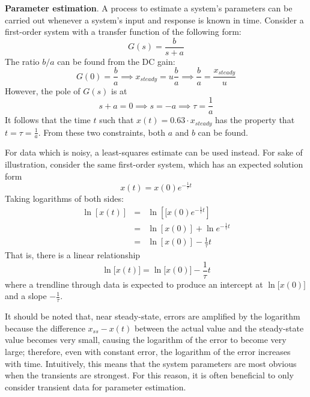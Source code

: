 \begin{shaded}
\textbf{Parameter estimation}. A process to estimate a system's parameters can be carried out whenever a system's input and response is known in time. Consider a first-order system with a transfer function of the following form: \[G(s) = \frac{b}{s+a}\] The ratio $b/a$ can be found from the DC gain: \[G(0) = \frac{b}{a} \implies x_{steady} = u \frac{b}{a} \implies \frac{b}{a} = \frac{x_{steady}}{u}\] However, the pole of $G(s)$ is at \[ s + a = 0 \implies s = -a \implies \tau = \frac{1}{a}\] It follows that the time $t$ such that $x(t) = 0.63\cdot x_{steady}$ has the property that $t=\tau = \frac{1}{a}$. From these two constraints, both $a$ and $b$ can be found. 

For data which is noisy, a least-squares estimate can be used instead. For sake of illustration, consider the same first-order system, which has an expected solution form \[x(t) = x(0) e^{-\frac{1}{\tau} t}\] Taking logarithms of both sides: \begin{eqnarray*}
    \ln[x(t)] &=& \ln \left[[x(0)e^{-\frac{1}{\tau} t}\right]\\
    &=& \ln [x(0)] + \ln e^{-\frac{1}{\tau} t}\\
    &=& \ln [x(0)] - \frac{1}{\tau} t
\end{eqnarray*} That is, there is a linear relationship \[\ln\big[ x(t)\big] = \ln \big[ x(0)\big] - \frac{1}{\tau} t\] where a trendline through data is expected to produce an intercept at $\ln \big[ x(0)\big]$ and a slope $-\frac{1}{\tau}$.

It should be noted that, near steady-state, errors are amplified by the logarithm because the difference $x_{ss} - x(t)$ between the actual value and the steady-state value becomes very small, causing the logarithm of the error to become very large; therefore, even with constant error, the logarithm of the error increases with time. Intuitively, this means that the system parameters are most obvious when the transients are strongest. For this reason, it is often beneficial to only consider transient data for parameter estimation.
\end{shaded}

